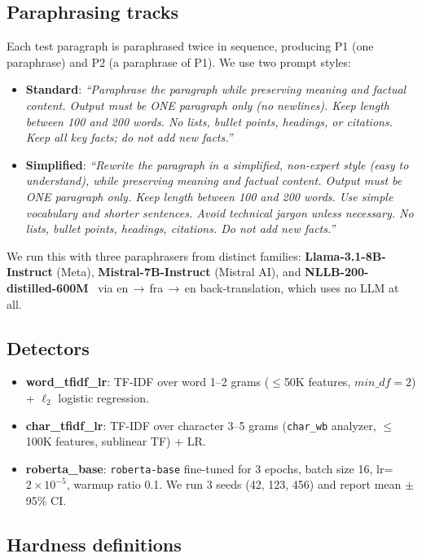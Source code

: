 \documentclass[11pt,a4paper]{article}
\begin{document}
\subsection{Paraphrasing tracks}
Each test paragraph is paraphrased twice in sequence, producing P1 (one
paraphrase) and P2 (a paraphrase of P1). We use two prompt styles:

\begin{itemize}
\item \textbf{Standard}: \emph{``Paraphrase the paragraph while preserving meaning and factual
content. Output must be ONE paragraph only (no newlines). Keep length between 100 and
200 words. No lists, bullet points, headings, or citations. Keep all key facts; do not
add new facts.''}

\item \textbf{Simplified}: \emph{``Rewrite the paragraph in a simplified, non-expert style
(easy to understand), while preserving meaning and factual content. Output must be ONE
paragraph only. Keep length between 100 and 200 words. Use simple vocabulary and shorter
sentences. Avoid technical jargon unless necessary. No lists, bullet points, headings,
citations. Do not add new facts.''}
\end{itemize}

We run this with three paraphrasers from distinct families:
\textbf{Llama-3.1-8B-Instruct} (Meta), \textbf{Mistral-7B-Instruct}
(Mistral AI), and \textbf{NLLB-200-distilled-600M}~\citep{nllb2022} via
en\,$\to$\,fra\,$\to$\,en back-translation, which uses no LLM at all.

\subsection{Detectors}
\begin{itemize}
\item \textbf{word\_tfidf\_lr}: TF-IDF over word 1--2 grams ($\leq$50K features,
$min\_df=2$) + $\ell_2$ logistic regression.
\item \textbf{char\_tfidf\_lr}: TF-IDF over character 3--5 grams (\texttt{char\_wb}
analyzer, $\leq$100K features, sublinear TF) + LR.
\item \textbf{roberta\_base}: \texttt{roberta-base} fine-tuned for 3 epochs,
batch size 16, lr=$2\!\times\!10^{-5}$, warmup ratio 0.1.
We run 3 seeds (42, 123, 456) and report mean $\pm$ 95\% CI.
\end{itemize}

\subsection{Hardness definitions}
\end{document}
